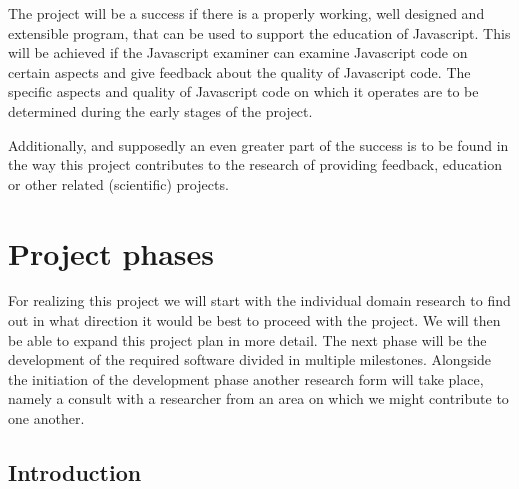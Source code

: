 \documentclass{article}
\begin{document}
The project will be a success if there is a properly working, well designed and extensible program, that can be used to support the education of Javascript. This will be achieved if the Javascript examiner can examine Javascript code on certain aspects and give feedback about the quality of Javascript code. The specific aspects and quality of Javascript code on which it operates are to be determined during the early stages of the project.

Additionally, and supposedly an even greater part of the success is to be found in the way this project contributes to the research of providing feedback, education or other related (scientific) projects.

\section{Project phases}


For realizing this project we will start with the individual domain research to find out in what direction it would be best to proceed with the project. We will then be able to expand this project plan in more detail. The next phase will be the development of the required software divided in multiple milestones. Alongside the initiation of the development phase another research form will take place, namely a consult with a researcher from an area on which we might contribute to one another.

\subsection{Introduction}

\end{document}
